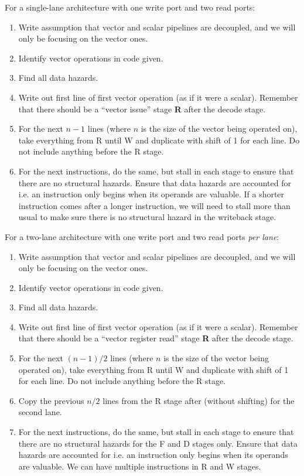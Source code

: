 \documentclass{article}
\begin{document}
For a single-lane architecture with one write port and two read ports:
\begin{enumerate}
\item Write assumption that vector and scalar pipelines are decoupled, and we will only be focusing on the vector ones.
\item Identify vector operations in code given.
\item Find all data hazards.
\item Write out first line of first vector operation (as if it were a scalar). Remember that there should be a ``vector issue'' stage \textbf{R} after the decode stage.
\item For the next $n-1$ lines (where $n$ is the size of the vector being operated on), take everything from R until W and duplicate with shift of 1 for each line. Do not include anything before the R stage.
\item For the next instructions, do the same, but stall in each stage to ensure that there are no structural hazards. Ensure that data hazards are accounted for i.e. an instruction only begins when its operands are valuable. If a shorter instruction comes after a longer instruction, we will need to stall more than usual to make sure there is no structural hazard in the writeback stage.
\end{enumerate}

For a two-lane architecture with one write port and two read ports \textit{per lane}:
\begin{enumerate}
\item Write assumption that vector and scalar pipelines are decoupled, and we will only be focusing on the vector ones.
\item Identify vector operations in code given.
\item Find all data hazards.
\item Write out first line of first vector operation (as if it were a scalar). Remember that there should be a ``vector register read'' stage \textbf{R} after the decode stage.
\item For the next $(n-1)/2$ lines (where $n$ is the size of the vector being operated on), take everything from R until W and duplicate with shift of 1 for each line. Do not include anything before the R stage.
\item Copy the previous $n/2$ lines from the R stage after (without shifting) for the second lane.
\item For the next instructions, do the same, but stall in each stage to ensure that there are no structural hazards for the F and D stages only. Ensure that data hazards are accounted for i.e. an instruction only begins when its operands are valuable. We can have multiple instructions in R and W stages.
\end{enumerate}
\end{document}
